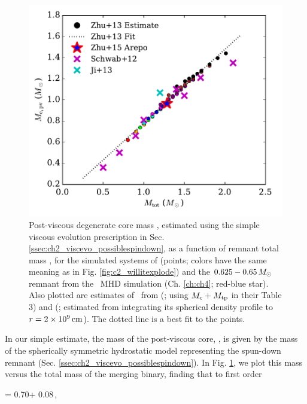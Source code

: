 
\begin{figure}
\centering
\includegraphics[angle=0,width=0.6\columnwidth]{chapter2_zhu+13/figures/c2a_mcpv.pdf}
\caption{Post-viscous degenerate core mass \Mcpv, estimated using the simple viscous evolution prescription in Sec. \ref{ssec:ch2_viscevo_possiblespindown}, as a function of remnant total mass \Mtot, for the simulated systems of \citeal{zhu+13} (points; colors have the same meaning as in Fig. \ref{fig:c2_willitexplode}) and the $0.625 - 0.65\,\Msun$ remnant from the \arepo\ MHD simulation (Ch. \ref{ch:ch4}; red-blue star).  Also plotted are estimates of \Mcpv\ from \citeauthor{schw+12} (\citeyear{schw+12}; using $M_\mathrm{c} + M_\mathrm{tp}$ in their Table 3) and \citeauthor{ji+13} (\citeyear{ji+13}; estimated from integrating its spherical density profile to $r = 2\times10^9\,\mathrm{cm}$).  The dotted line is a best fit to the \citeal{zhu+13} points.}
\label{fig:c2a_mcpvvsmtot}
\end{figure}

In our simple estimate, the mass of the post-viscous core, \Mcpv, is given by the mass of the spherically symmetric hydrostatic model representing the spun-down remnant (Sec. \ref{ssec:ch2_viscevo_possiblespindown}).  In Fig. \ref{fig:c2a_mcpvvsmtot}, we plot this mass versus the total mass of the merging binary, finding that to first order

\eqbegin
\Mcpv = 0.70\Mtot + 0.08\,\Msun,
\label{eq:c2a_mfit}
\eqend

